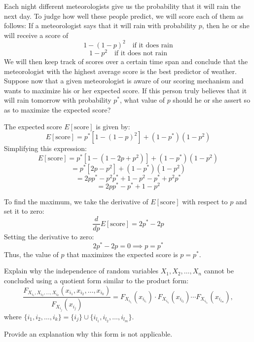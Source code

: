 \begin{exercise}
  Each night different meteorologists give us the probability that it will rain the next day. To judge how well these people predict, we will score each of them as follows: If a meteorologist says that it will rain with probability \( p \), then he or she will receive a score of
  \[
  1 - (1 - p)^2 \quad \text{if it does rain}
  \]
  \[
  1 - p^2 \quad \text{if it does not rain}
  \]
  We will then keep track of scores over a certain time span and conclude that the meteorologist with the highest average score is the best predictor of weather. Suppose now that a given meteorologist is aware of our scoring mechanism and wants to maximize his or her expected score. If this person truly believes that it will rain tomorrow with probability \( p^* \), what value of \( p \) should he or she assert so as to maximize the expected score?
\end{exercise}

\begin{solution}
  The expected score \( E[\text{score}] \) is given by:
  \[
  E[\text{score}] = p^*[1 - (1 - p)^2] + (1 - p^*)(1 - p^2)
  \]
  Simplifying this expression:
  \[
  E[\text{score}] = p^*[1 - (1 - 2p + p^2)] + (1 - p^*)(1 - p^2)
  \]
  \[
  = p^*[2p - p^2] + (1 - p^*)(1 - p^2)
  \]
  \[
  = 2p p^* - p^2 p^* + 1 - p^2 - p^* + p^2 p^*
  \]
  \[
  = 2p p^* - p^* + 1 - p^2
  \]

  To find the maximum, we take the derivative of \( E[\text{score}] \) with respect to \( p \) and set it to zero:
  \[
  \frac{d}{dp} E[\text{score}] = 2p^* - 2p
  \]
  Setting the derivative to zero:
  \[
  2p^* - 2p = 0 \implies p = p^*
  \]
  Thus, the value of \( p \) that maximizes the expected score is \( p = p^* \).
\end{solution}

\begin{exercise}
    Explain why the independence of random variables \( X_1, X_2, \ldots, X_n \) cannot be concluded using a quotient form similar to the product form:
    \[
    \frac{F_{X_{i_1}, X_{i_2}, \ldots, X_{i_k}}(x_{i_1}, x_{i_2}, \ldots, x_{i_k})}{F_{X_{i_j}}(x_{i_j})} = F_{X_{i_{l_1}}}(x_{i_{l_1}}) \cdot F_{X_{i_{l_2}}}(x_{i_{l_2}}) \cdots F_{X_{i_{l_m}}}(x_{i_{l_m}}),
    \]
    where \( \{i_1, i_2, \ldots, i_k\} = \{i_j\} \cup \{i_{l_1}, i_{l_2}, \ldots, i_{l_m}\} \).

    Provide an explanation why this form is not applicable.
\end{exercise}

